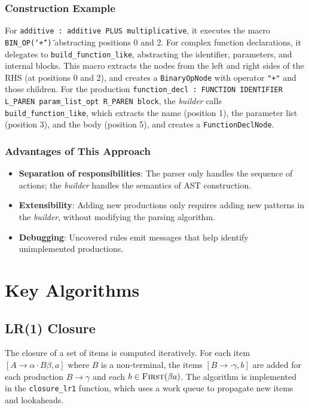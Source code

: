 \documentclass[12pt,a4paper]{report}
\begin{document}
\subsubsection{Construction Example}
For \texttt{additive : additive PLUS multiplicative}, it executes the macro \texttt{BIN\_OP(\char`\"+\char`\")} abstracting positions 0 and 2. For complex function declarations, it delegates to \texttt{build\_function\_like}, abstracting the identifier, parameters, and internal blocks.
This macro extracts the nodes from the left and right sides of the RHS (at positions 0 and 2), and creates a \texttt{BinaryOpNode} with operator \texttt{"+"} and those children.
For the production \verb|function_decl : FUNCTION IDENTIFIER L_PAREN param_list_opt R_PAREN block|, the \textit{builder} calls \texttt{build\_function\_like}, which extracts the name (position 1), the parameter list (position 3), and the body (position 5), and creates a \texttt{FunctionDeclNode}.

\subsubsection{Advantages of This Approach}
\begin{itemize}
    \item \textbf{Separation of responsibilities}: The parser only handles the sequence of actions;
    the \textit{builder} handles the semantics of AST construction.
    \item \textbf{Extensibility}: Adding new productions only requires adding new patterns in the \textit{builder}, without modifying the parsing algorithm.
    \item \textbf{Debugging}: Uncovered rules emit messages that help identify unimplemented productions.
\end{itemize}

\section{Key Algorithms}

\subsection{LR(1) Closure}

The closure of a set of items is computed iteratively.
For each item $[A \to \alpha \cdot B \beta, a]$ where $B$ is a non-terminal, the items $[B \to \cdot \gamma, b]$
are added for each production $B \to \gamma$ and each $b \in \textsc{First}(\beta a)$.
The algorithm is implemented in the \texttt{closure\_lr1} function, which uses a work queue to propagate new items and lookaheads.
\end{document}

